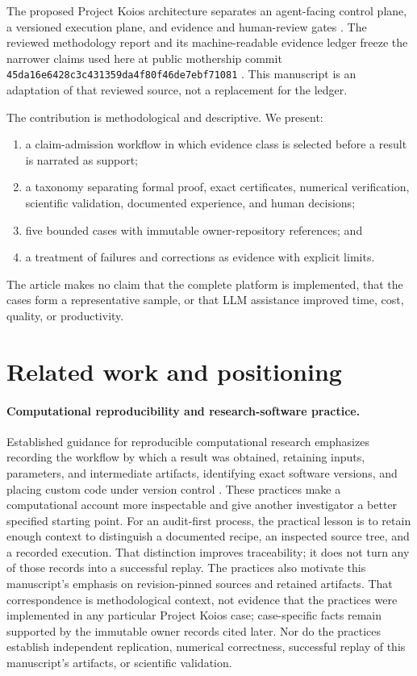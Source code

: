 \documentclass[11pt]{article}
\newcommand{\projectkoios}{Project Koios}
\begin{document}
The proposed \projectkoios{} architecture separates an agent-facing control
plane, a versioned execution plane, and evidence and human-review gates
\citep{projectkoios_architecture_2026}. The reviewed methodology report and its
machine-readable evidence ledger freeze the narrower claims used here at public
mothership commit
\texttt{45da16e6428c3c431359da4f80f46de7ebf71081}
\citep{projectkoios_report_2026,projectkoios_ledger_2026}. This manuscript is an
adaptation of that reviewed source, not a replacement for the ledger.

The contribution is methodological and descriptive. We present:

\begin{enumerate}
  \item a claim-admission workflow in which evidence class is selected before a
  result is narrated as support;
  \item a taxonomy separating formal proof, exact certificates, numerical
  verification, scientific validation, documented experience, and human
  decisions;
  \item five bounded cases with immutable owner-repository references; and
  \item a treatment of failures and corrections as evidence with explicit
  limits.
\end{enumerate}

The article makes no claim that the complete platform is implemented, that the
cases form a representative sample, or that LLM assistance improved time, cost,
quality, or productivity.

\section{Related work and positioning}
\label{sec:related-work}

\paragraph{Computational reproducibility and research-software practice.}
Established guidance for reproducible computational research emphasizes
recording the workflow by which a result was obtained, retaining inputs,
parameters, and intermediate artifacts, identifying exact software versions,
and placing custom code under version control
\citep{SandveEtAl2013ReproducibleComputationalResearch}. These practices make a
computational account more inspectable and give another investigator a better
specified starting point. For an audit-first process, the practical lesson is
to retain enough context to distinguish a documented recipe, an inspected
source tree, and a recorded execution. That distinction improves traceability;
it does not turn any of those records into a successful replay. The practices
also motivate this manuscript's emphasis on revision-pinned sources and
retained artifacts. That correspondence is
methodological context, not evidence that the practices were implemented in any
particular \projectkoios{} case; case-specific facts remain supported by the
immutable owner records cited later. Nor do the practices establish independent
replication, numerical correctness, successful replay of this manuscript's
artifacts, or scientific validation.
\end{document}
